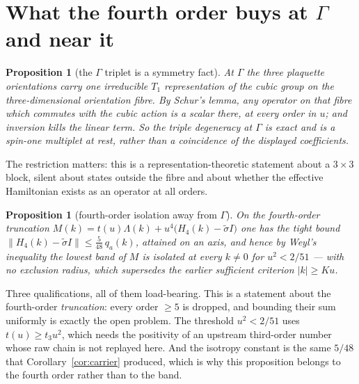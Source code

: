 \documentclass[11pt]{article}
\newtheorem{proposition}[theorem]{Proposition}
\theoremstyle{definition}
\theoremstyle{remark}
\newcommand{\chk}[1]{}
\begin{document}
\section{What the fourth order buys at $\Gamma$ and near it}\label{sec:gamma}

\begin{proposition}[the $\Gamma$ triplet is a symmetry fact]\label{prop:gamma}
At $\Gamma$ the three plaquette orientations carry one irreducible $T_1$
representation of the cubic group on the three-dimensional orientation fibre.
By Schur's lemma, any operator on \emph{that fibre} which commutes with the
cubic action is a scalar there, at every order in $u$; and inversion kills the
linear term. So the triple degeneracy at $\Gamma$ is exact and is a spin-one
multiplet at rest, rather than a coincidence of the displayed
coefficients.\chk{the three plaquette orientations at k = 0 carry an irreducible representation of the cubic group (the T1 triplet), so every cubic-covariant effective Hamiltonian is a scalar at Gamma at every order}
\end{proposition}

The restriction matters: this is a representation-theoretic statement about a
$3\times3$ block, silent about states outside the fibre and about whether the
effective Hamiltonian exists as an operator at all orders.

\begin{proposition}[fourth-order isolation away from $\Gamma$]\label{prop:iso}
On the fourth-order truncation $M(k)=t(u)\Lambda(k)+u^4\bigl(H_4(k)-\tilde\sigma
I\bigr)$ one has the tight bound $\|H_4(k)-\tilde\sigma I\|\le\tfrac{5}{48}\,q_a(k)$,
attained on an axis, and hence by Weyl's inequality the lowest band of $M$ is
isolated at \emph{every} $k\ne0$ for $u^2<2/51$ --- with no exclusion radius,
which supersedes the earlier sufficient criterion $|k|\ge Ku$.\chk{the fourth-order kernel is bounded by C\_iso q\_a(k) away from its Gamma scalar, C\_iso = 5/48 for the assembled C\_shp, so the flat band is isolated at every k != 0 for u\^{}2 < 2/51 -- no exclusion radius}
\end{proposition}

Three qualifications, all of them load-bearing. This is a statement about the
fourth-order \emph{truncation}: every order $\ge5$ is dropped, and bounding
their sum uniformly is exactly the open problem. The threshold $u^2<2/51$ uses
$t(u)\ge t_3u^2$, which needs the positivity of an upstream third-order number
whose raw chain is not replayed here. And the isotropy constant is the same
$5/48$ that Corollary~\ref{cor:carrier} produced, which is why this proposition
belongs to the fourth order rather than to the band.
\end{document}

